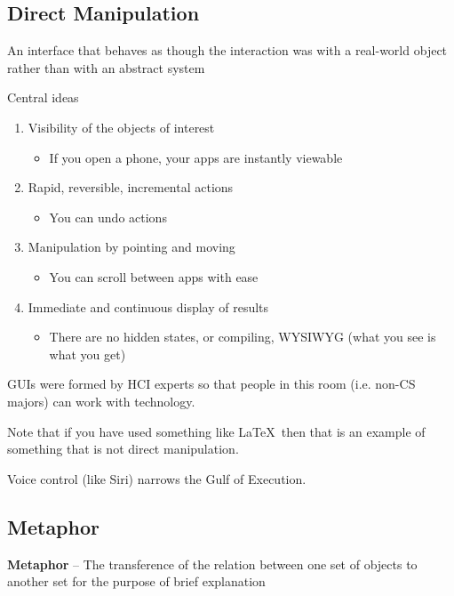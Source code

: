 \subsection{Direct Manipulation}
An interface that behaves as though the interaction was with a real-world object rather than with an abstract system

Central ideas
\begin{enumerate}
    \item Visibility of the objects of interest
        \begin{itemize}
            \item If you open a phone, your apps are instantly viewable
        \end{itemize}
    \item Rapid, reversible, incremental actions
        \begin{itemize}
            \item You can undo actions
        \end{itemize}
    \item Manipulation by pointing and moving
        \begin{itemize}
            \item You can scroll between apps with ease
        \end{itemize}
    \item Immediate and continuous display of results
        \begin{itemize}
            \item There are no hidden states, or compiling, WYSIWYG (what you see is what you get)
        \end{itemize}
\end{enumerate}
GUIs were formed by HCI experts so that people in this room (i.e. non-CS majors) can work with technology.

\begin{important}
Note that if you have used something like \LaTeX\ then that is an example of something that is not direct manipulation.
\end{important}

Voice control (like Siri) narrows the Gulf of Execution.

\subsection{Metaphor}
\begin{shaded}
    \textbf{Metaphor} -- The transference of the relation between one set of objects to another set for the purpose of brief explanation
\end{shaded}

